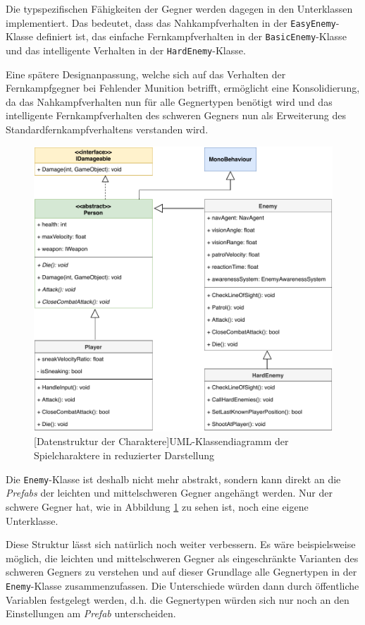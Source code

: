 Die typspezifischen Fähigkeiten der Gegner werden dagegen in den Unterklassen implementiert. Das bedeutet, dass das Nahkampfverhalten in der \texttt{EasyEnemy}-Klasse definiert ist, das einfache Fernkampfverhalten in der \texttt{BasicEnemy}-Klasse und das intelligente Verhalten in der \texttt{HardEnemy}-Klasse.

Eine spätere Designanpassung, welche sich auf das Verhalten der Fernkampfgegner bei Fehlender Munition betrifft, ermöglicht eine Konsolidierung, da das Nahkampfverhalten nun für alle Gegnertypen benötigt wird und das intelligente Fernkampfverhalten des schweren Gegners nun als Erweiterung des Standardfernkampfverhaltens verstanden wird.

\begin{figure}[h]
 \centering
 \includegraphics[width=0.835\linewidth]{diagrams/Person_Structure_reduced.pdf}
 [Datenstruktur der Charaktere]{UML-Klassendiagramm der Spielcharaktere in reduzierter Darstellung}
	\label{fig:charactersStructure}
\end{figure}


Die \texttt{Enemy}-Klasse ist deshalb nicht mehr abstrakt, sondern kann direkt an die \textit{Prefabs} der leichten und mittelschweren Gegner angehängt werden. Nur der schwere Gegner hat, wie in Abbildung \ref{fig:charactersStructure} zu sehen ist, noch eine eigene Unterklasse.

Diese Struktur lässt sich natürlich noch weiter verbessern. Es wäre beispielsweise möglich, die leichten und mittelschweren Gegner als eingeschränkte Varianten des schweren Gegners zu verstehen und auf dieser Grundlage alle Gegnertypen in der \texttt{Enemy}-Klasse zusammenzufassen. Die Unterschiede würden dann durch öffentliche Variablen festgelegt werden, d.h. die Gegnertypen würden sich nur noch an den Einstellungen am \textit{Prefab} unterscheiden.

